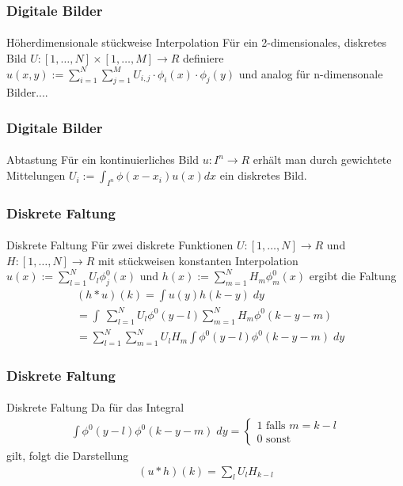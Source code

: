 \documentclass{beamer}
\begin{document}
\begin{frame}
    \frametitle{Digitale Bilder}
\framesubtitle{}
\begin{block}{Höherdimensionale stückweise  Interpolation}
Für ein 2-dimensionales, diskretes Bild $U : [1, \ldots, N] \times   [1, \ldots, M] \to R$ definiere 
 $u(x, y) := \sum_{i=1}^{N} \sum_{j=1}^{M}  U_{i,j} \cdot \phi_i(x) \cdot \phi_j(y)$ und analog für n-dimensonale Bilder....
\end{block}
 \end{frame}


\begin{frame}
    \frametitle{Digitale Bilder}
\framesubtitle{}
\begin{block}{Abtastung}
Für ein kontinuierliches  Bild $u : I^n \to R$ erhält man durch gewichtete Mittelungen
$U_i := \int_{I^n} \phi (x - x_i) u(x) dx$ ein diskretes Bild. 
\end{block}
 \end{frame}



\begin{frame}
    \frametitle{Diskrete Faltung}
\framesubtitle{}

    \begin{block}{Diskrete Faltung}
Für zwei diskrete  Funktionen $U : [1, \ldots, N]  \to R$ und $H : [1, \ldots, N]  \to R$ mit stückweisen konstanten Interpolation $u(x) := \sum_{l=1}^{N} U_l \phi^0_j(x)$ und 
$h(x) := \sum_{m=1}^{N} H_m \phi^0_m(x)$ ergibt die Faltung 
\begin{align*}
& (h * u)(k) = \int u(y)h(k-y)  \; dy \\
& = \int \ \sum_{l=1}^{N} U_l \phi^0(y-l) \sum_{m=1}^{N} H_m \phi^0(k-y-m) \\
& = \sum_{l=1}^{N}   \sum_{m=1}^{N} U_l  H_m  \int  \phi^0(y-l) \phi^0(k-y-m) \; dy 
\end{align*}

\end{block}
 \end{frame}

\begin{frame}
    \frametitle{Diskrete Faltung}
\framesubtitle{}

    \begin{block}{Diskrete Faltung}
Da für das Integral 
\begin{align*}
  \int  \phi^0(y-l) \phi^0(k-y-m)  \; dy  = \begin{cases}
1 \text{ falls } m = k -l\\
0 \text{ sonst }
\end{cases}
\end{align*}
gilt, folgt die Darstellung
\begin{align*}
 (u  * h)(k) = \sum_l U_l H_{k-l}
\end{align*}

\end{block}

 \end{frame}
\end{document}
